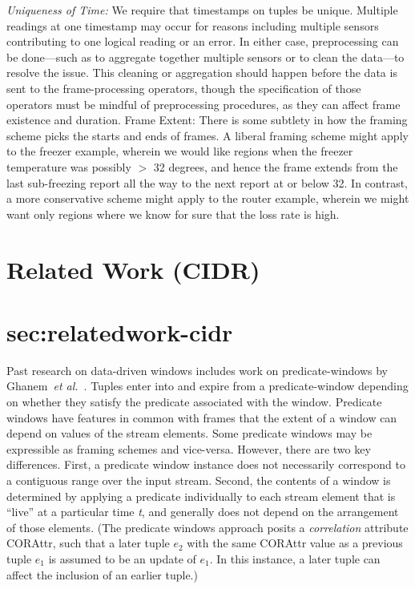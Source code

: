\documentclass{vldb}
\newcommand{\dquote}[1]{``#1''}
\begin{document}
\begin{appendix}
\emph{Uniqueness of Time:} We require that timestamps on tuples be unique. Multiple readings at one timestamp may occur for reasons including multiple sensors contributing to one logical reading or an error. In either case, preprocessing can be done—such as to aggregate together multiple sensors or to clean the data—to resolve the issue. This cleaning or aggregation should happen before the data is sent to the frame-processing operators, though the specification of those operators must be mindful   of preprocessing procedures, as they can affect frame existence and duration. 
Frame Extent: There is some subtlety in how the framing scheme picks the starts and ends of frames. A liberal framing scheme might apply to the freezer example, wherein we would like regions when the freezer temperature was possibly $>$ 32 degrees, and hence the frame extends from the last sub-freezing report all the way to the next report at or below 32. In contrast, a more conservative scheme might apply to the router example, wherein we might want only regions where we know for sure that the loss rate is high.

\section{Related Work (CIDR)}
\section{sec:relatedwork-cidr}

Past research on data-driven windows includes work on predicate-windows by Ghanem~\emph{et al.}~\cite{GAE2006,GEL+2009}. Tuples enter into and expire from a predicate-window depending on whether they satisfy the predicate associated with the window. Predicate windows have features in common with frames that the extent of a window can depend on values of the stream elements. Some predicate windows may be expressible as framing schemes and vice-versa. However, there are two key differences. First, a predicate window instance does not necessarily correspond to a contiguous range over the input stream. Second, the contents of a window is determined by applying a predicate individually to each stream element that is \dquote{live} at a particular time \emph{t}, and generally does not depend on the arrangement of those elements. (The predicate windows approach posits a \emph{correlation} attribute CORAttr, such that a later tuple $e_2$ with the same CORAttr value as a previous tuple $e_1$ is assumed to be an update of $e_1$. In this instance, a later tuple can affect the inclusion of an earlier tuple.) 


\end{appendix}
\end{document}

